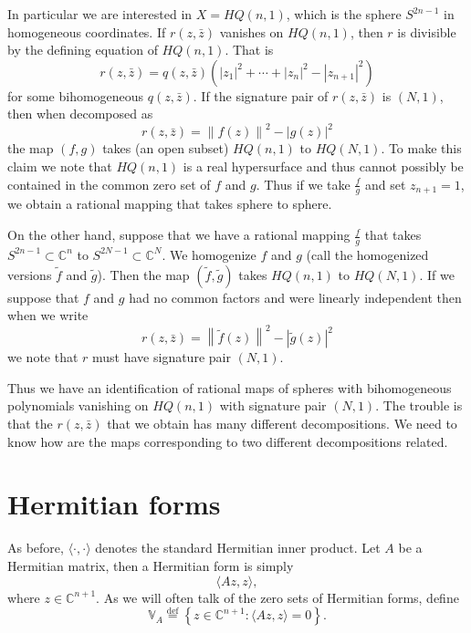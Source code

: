 \documentclass[12pt,openany]{book}
\newcommand{\abs}[1]{\left\lvert {#1} \right\rvert}
\newcommand{\norm}[1]{\left\lVert {#1} \right\rVert}
\newcommand{\C}{{\mathbb{C}}}
\newcommand{\bV}{{\mathbb{V}}}
\theoremstyle{plain}
\theoremstyle{remark}
\theoremstyle{definition}
\theoremstyle{exercise}
\theoremstyle{example}
\begin{document}
In particular we are interested in $X = HQ(n,1)$, which is the sphere
$S^{2n-1}$ in homogeneous coordinates.  If $r(z,\bar{z})$ vanishes
on $HQ(n,1)$, then $r$ is divisible by the defining equation of $HQ(n,1)$.
That is
\begin{equation}
r(z,\bar{z}) = q(z,\bar{z})
\left( \abs{z_1}^2 + \cdots + \abs{z_n}^2 - \abs{z_{n+1}}^2 \right)
\end{equation}
for some bihomogeneous $q(z,\bar{z})$.  If the signature pair of
$r(z,\bar{z})$ is $(N,1)$, then when decomposed as
\begin{equation}
r(z,\bar{z}) = 
\norm{f(z)}^2 - \abs{g(z)}^2
\end{equation}
the map $(f,g)$ takes (an open subset) $HQ(n,1)$ to $HQ(N,1)$.  To
make this claim we note that $HQ(n,1)$ is a real hypersurface and thus cannot
possibly be contained in the common zero set of $f$ and $g$.
Thus if we take $\frac{f}{g}$ and set $z_{n+1} = 1$, we obtain a rational
mapping that takes sphere to sphere.

On the other hand, suppose that we have a rational mapping $\frac{f}{g}$
that takes
$S^{2n-1} \subset \C^n$ to $S^{2N-1} \subset \C^N$.  We homogenize $f$ and
$g$ (call the homogenized versions $\tilde{f}$ and $\tilde{g}$).  Then
the map $(\tilde{f},\tilde{g})$ takes $HQ(n,1)$ to $HQ(N,1)$.
If we suppose that $f$ and $g$ had no common factors and were linearly
independent then when we write
\begin{equation}
r(z,\bar{z}) = \norm{\tilde{f}(z)}^2 - \abs{\tilde{g}(z)}^2
\end{equation}
we note that $r$ must have signature pair $(N,1)$.

Thus we have an identification of rational maps of spheres with bihomogeneous
polynomials vanishing on $HQ(n,1)$ with signature pair $(N,1)$.  The trouble
is that the $r(z,\bar{z})$ that we obtain has many different decompositions.
We need to know how are the maps corresponding to two different
decompositions related.


\section{Hermitian forms} \label{section:hermforms}

As before, $\langle \cdot , \cdot \rangle$ denotes the standard
Hermitian inner product.
Let $A$ be a Hermitian matrix, then a Hermitian form is simply
\begin{equation}
\langle A z , z \rangle ,
\end{equation}
where $z \in \C^{n+1}$.
As we will often talk of the zero sets of Hermitian forms,
define
\begin{equation}
\bV_A \overset{\text{def}}{=}
\left\{ z \in \C^{n+1} :
\langle A z , z \rangle = 0 \right\} .
\end{equation}
\end{document}
